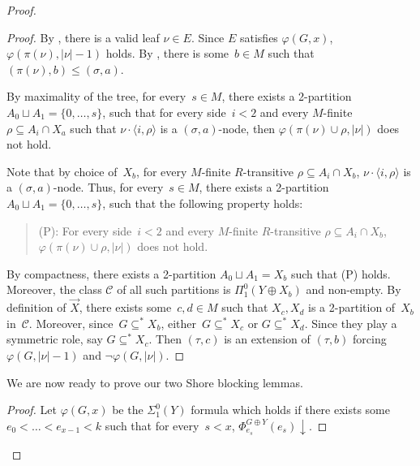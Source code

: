 \documentclass{article}
\numberwithin{theorem}{section}
\newtheorem{lemma}[theorem]{Lemma}
\newcommand{\C}{\mathcal{C}}
\newcommand{\M}{\mathcal{M}}
\newcommand{\uh}[0]{{\upharpoonright}}
\begin{document}
\begin{proof}
\begin{proof}
By , there is a valid leaf  $\nu \in E$.
Since $E$ satisfies $\varphi(G, x)$, $\varphi(\pi(\nu), |\nu|-1)$ holds.
By , there is some~$b \in M$ such that $(\pi(\nu), b) \leq (\sigma, a)$.

By maximality of the tree, for every~$s \in M$, there exists a 2-partition $A_0 \sqcup A_1 = \{0,\dots,s\}$, such that for every side~$i < 2$ and every $M$-finite $\rho \subseteq A_i \cap X_a$ such that
$\nu \cdot \langle i, \rho \rangle$ is a $(\sigma, a)$-node, then $\varphi(\pi(\nu) \cup \rho, |\nu|)$ does not hold.

Note that by choice of~$X_b$, for every $M$-finite $R$-transitive $\rho \subseteq A_i \cap X_b$, $\nu \cdot \langle i, \rho \rangle$ is a $(\sigma, a)$-node. Thus, for every~$s \in M$, there exists a 2-partition $A_0 \sqcup A_1 = \{0,\dots,s\}$, such that the following property holds:
\begin{quote}
(P): For every side~$i < 2$ and every $M$-finite $R$-transitive $\rho \subseteq A_i \cap X_b$, $\varphi(\pi(\nu) \cup \rho, |\nu|)$ does not hold.
\end{quote}

By compactness, there exists a 2-partition $A_0 \sqcup A_1 = X_b$ such that (P) holds. Moreover, the class $\C$ of all such partitions is $\Pi^0_1(Y \oplus X_b)$ and non-empty. By definition of $\vec{X}$, there exists some~$c,d \in M$ such that $X_c, X_d$ is a 2-partition of~$X_b$ in~$\C$. Moreover, since~$G \subseteq^* X_b$, either~$G \subseteq^* X_c$ or $G \subseteq^* X_d$. Since they play a symmetric role, say $G \subseteq^* X_c$. Then $(\tau, c)$ is an extension of $(\tau, b)$ forcing $\varphi(G, |\nu|-1)$ and $\neg \varphi(G, |\nu|)$.
\end{proof}

We are now ready to prove our two Shore blocking lemmas.



\begin{proof}
Let $\varphi(G, x)$ be the $\Sigma^0_1(Y)$ formula which holds if there exists some~$e_0 < \dots < e_{x-1} < k$ such that for every~$s < x$, $\Phi^{G \oplus Y}_{e_s}(e_s)\downarrow$.


\end{proof}
\end{proof}
\end{document}
